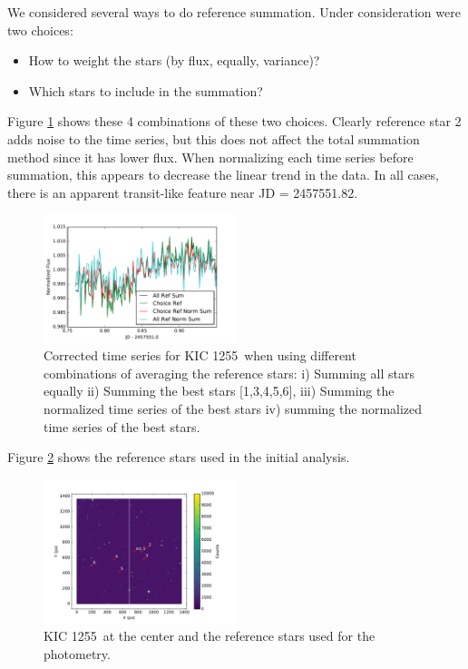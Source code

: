 \documentclass[twocolumn]{aastex61}
\newcommand{\shStar}{KIC 1255}
\begin{document}
We considered several ways to do reference summation.
Under consideration were two choices:
\begin{itemize}
	\item How to weight the stars (by flux, equally, variance)?
	\item Which stars to include in the summation?
\end{itemize}
Figure \ref{fig:refSumMethods} shows these 4 combinations of these two choices.
Clearly reference star 2 adds noise to the time series, but this does not affect the total summation method since it has lower flux.
When normalizing each time series before summation, this appears to decrease the linear trend in the data.
In all cases, there is an apparent transit-like feature near JD = 2457551.82.

\begin{figure}
\begin{centering}
\includegraphics[width=0.5\textwidth]{images/reference_method.pdf}
\caption{Corrected time series for \shStar\ when using different combinations of averaging the reference stars: i) Summing all stars equally ii) Summing the best stars [1,3,4,5,6], iii) Summing the normalized time series of the best stars iv) summing the normalized time series of the best stars.}\label{fig:refSumMethods}
\end{centering}
\end{figure}

Figure \ref{fig:starLabels} shows the reference stars used in the initial analysis.

\begin{figure}
\begin{centering}
\includegraphics[width=0.5\textwidth]{images/st_labels.pdf}
\caption{\shStar\ at the center and the reference stars used for the photometry.}\label{fig:starLabels}
\end{centering}
\end{figure}
\end{document}
